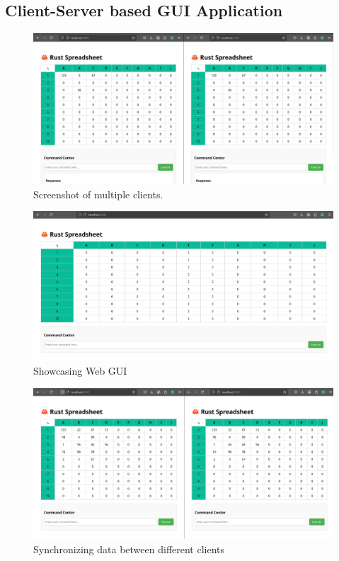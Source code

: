 \subsection{Client-Server based GUI Application}

 	\begin{figure}[H]
    		\centering
    		\includegraphics[width=0.75\columnwidth]{figures/2_servers_gui.png}
    		\caption{Screenshot of multiple clients.}
    		\label{fig:figure}
    	\end{figure}

        \begin{figure}[H]
            \centering
            \includegraphics[width=0.75\linewidth]{figures/Web_GUI.png}
            \caption{Showcasing Web GUI}
            \label{fig:enter-label}
        \end{figure}

        \begin{figure}[H]
            \centering
            \includegraphics[width=0.75\linewidth]{figures/sync_data_gui.png}
            \caption{Synchronizing data between different clients}
            \label{fig:enter-label}
        \end{figure}


